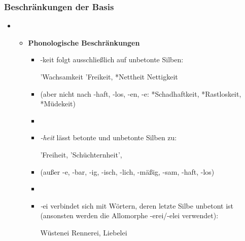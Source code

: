\begin{frame}
\frametitle{Beschränkungen der Basis}

\begin{itemize}
	\item[]
	
	\begin{itemize}
		\item \textbf{Phonologische Beschränkungen}
		
		\begin{itemize}
			\item -keit folgt ausschließlich auf unbetonte Silben: 				
			
			\ea 'Wachsamkeit \vs *'Freikeit, *Nettheit \vs Nettigkeit
			\z
			
			\item[](aber nicht nach -haft, -los, -en, -e: *Schadhaftkeit, *Rastloskeit, *Müdekeit)
			
			\item[]
			\item \textit{-heit} lässt betonte und unbetonte Silben zu: 
			
			\ea 'Freiheit, 'Schüchternheit’, 
			\z
			
			\item[] (außer -e, -bar, -ig, -isch, -lich, -mäßig, -sam, -haft, -los)
			\item[]
			\item \textit-ei verbindet sich mit Wörtern, deren letzte Silbe unbetont ist (ansonsten werden die Allomorphe -erei/-elei verwendet): 

			\ea Wüstenei \vs Rennerei, Liebelei
			\z
			
		\end{itemize}
		
	\end{itemize}

\end{itemize}

\end{frame}




